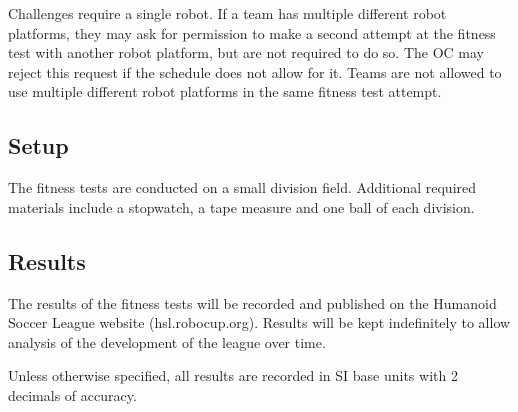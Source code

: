 \documentclass[12pt]{article}
\begin{document}
Challenges require a single robot. If a team has multiple different robot platforms, they may ask for permission to make a second attempt at the fitness test with another robot platform, but are not required to do so. The OC may reject this request if the schedule does not allow for it. Teams are not allowed to use multiple different robot platforms in the same fitness test attempt.

\subsection{Setup}

The fitness tests are conducted on a small division field. Additional required materials include a stopwatch, a tape measure and one ball of each division.

\subsection{Results}

The results of the fitness tests will be recorded and published on the Humanoid Soccer League website (hsl.robocup.org). Results will be kept indefinitely to allow analysis of the development of the league over time.

Unless otherwise specified, all results are recorded in SI base units with 2 decimals of accuracy.


\end{document}
